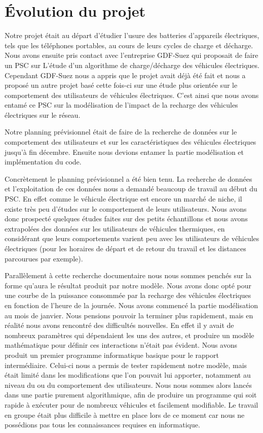 \section{Évolution du projet}
	Notre projet était au départ d'étudier l'usure des batteries d'appareils électriques, tels que les téléphones portables, au cours de leurs cycles de charge et décharge. Nous avons ensuite pris contact avec l'entreprise GDF-Suez qui proposait de faire un PSC sur \og{}L'étude d'un algorithme de charge/décharge des véhicules électriques\fg{}. Cependant GDF-Suez nous a appris que le projet avait déjà été fait et nous a proposé un autre projet basé cette fois-ci sur une étude plus orientée sur le comportement des utilisateurs de véhicules électriques. C'est ainsi que nous avons entamé ce PSC sur la modélisation de l'impact de la recharge des véhicules électriques sur le réseau. 
	
	Notre planning prévisionnel était de faire de la recherche de données sur le comportement des utilisateurs et sur les caractéristiques des véhicules électriques jusqu'à fin décembre. Ensuite nous devions entamer la partie modélisation et implémentation du code.
	
	Concrètement le planning prévisionnel a été bien tenu. La recherche de données et l'exploitation de ces données nous a demandé beaucoup de travail au début du PSC. En effet comme le véhicule électrique est encore un marché de niche, il existe très peu d'études sur le comportement de leurs utilisateurs. Nous avons donc prospecté quelques études faites sur des petits échantillons et nous avons extrapolées des données sur les utilisateurs de véhicules thermiques, en considérant que leurs comportements varient peu avec les utilisateurs de véhicules électriques (pour les horaires de départ et de retour du travail et les distances parcourues par exemple).
	
	Parallèlement à cette recherche documentaire nous nous sommes penchés sur la forme qu'aura le résultat produit par notre modèle. Nous avons donc opté pour une courbe de la puissance consommée par la recharge des véhicules électriques en fonction de l'heure de la journée. 
	Nous avons commencé la partie modélisation au mois de janvier. Nous pensions pouvoir la terminer plus rapidement, mais en réalité nous avons rencontré des difficultés nouvelles. En effet il y avait de nombreux paramètres qui dépendaient les uns des autres, et produire un modèle mathématique pour définir ces interactions n'était pas évident.
	Nous avons produit un premier programme informatique basique pour le rapport intermédiaire. Celui-ci nous a permis de tester rapidement notre modèle, mais était limité dans les modifications que l'on pouvait lui apporter, notamment au niveau du \smartgrid{} ou du comportement des utilisateurs.
	Nous nous sommes alors lancés dans une partie purement algorithmique, afin de produire un programme qui soit rapide à exécuter pour de nombreux véhicules et facilement modifiable. Le travail en groupe était plus difficile à mettre en place lors de ce moment car nous ne possédions pas tous les connaissances requises en informatique.
	
